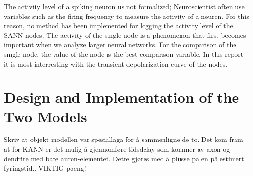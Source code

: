 The activity level of a spiking neuron us not formalized; Neuroscientist often use variables such as the firing frequency to measure the activity of a neuron.
For this reason, no method has been implemented for logging the activity level of the SANN nodes.
The activity of the single node is a phenomenon that first becomes important when we analyze larger neural networks.
For the comparison of the single node, the value of the node is the best comparison variable. 
In this report it is most interresting with the transient depolarization curve of the nodes.




\section{Design and Implementation of the Two Models}


	Skriv at objekt modellen var spesiallaga for å sammenligne de to. Det kom fram at for KANN er det mulig å gjennomføre tidsdelay som kommer av axon og dendrite med bare auron-elementet.
	Dette gjøres med å plusse på en på estimert fyringstid.. VIKTIG poeng!

